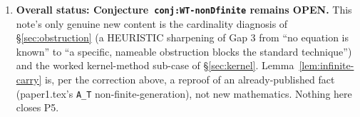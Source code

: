 \documentclass[11pt]{article}
\theoremstyle{remark}
\begin{document}
\begin{enumerate}
sanity check in \S\ref{sec:setup} and the small-root series expansion of $u_0(x)$ in \S\ref{sec:kernel},
both verifiable by hand and not requiring \texttt{wt\_carry} or \texttt{wt\_growth} to be re-run).
\item \textbf{Overall status: Conjecture~\texttt{conj:WT-nonDfinite} remains OPEN.} This note's only
genuine new content is the cardinality diagnosis of \S\ref{sec:obstruction} (a HEURISTIC sharpening of
Gap 3 from ``no equation is known'' to ``a specific, nameable obstruction blocks the standard
technique'') and the worked kernel-method sub-case of \S\ref{sec:kernel}. Lemma~\ref{lem:infinite-carry}
is, per the correction above, a reproof of an already-published fact (paper1.tex's \texttt{A\_T}
non-finite-generation), not new mathematics. Nothing here closes P5.
\end{enumerate}
\end{document}
